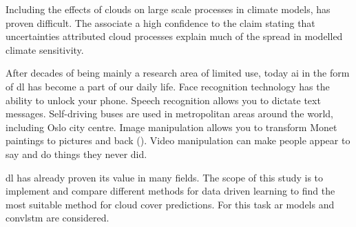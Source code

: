 
Including the effects of clouds on large scale processes in climate models, has proven difficult. The  associate a high confidence to the claim stating that uncertainties attributed cloud processes explain much of the spread in modelled climate sensitivity. 

After decades of being mainly a research area of limited use, today \acrfull{ai} in the form of \acrfull{dl} has become a part of our daily life. Face recognition technology has the ability to unlock your phone. Speech recognition allows you to dictate text messages. %
Self-driving buses are used in metropolitan areas around the world, including Oslo city centre.  %
Image manipulation allows you to transform Monet paintings to pictures and back (\cite{zhu2017_cycleGAN_monet_zebra}). Video manipulation can make people appear to say and do things they never did. 

\acrshort{dl} has already proven its value in many fields. The scope of this study is to implement and compare different methods for data driven learning to find the most suitable method for cloud cover predictions. For this task \acrfull{ar} models and \acrfull{convlstm} are considered. 

